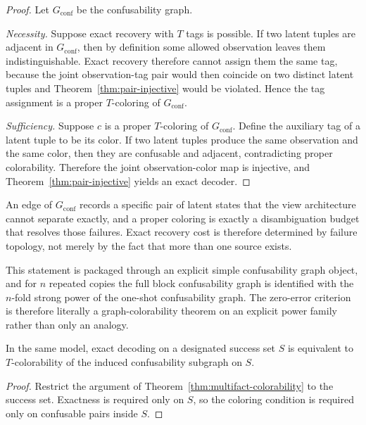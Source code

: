 \begin{proof}
Let $G_{\mathrm{conf}}$ be the confusability graph.

\emph{Necessity.} Suppose exact recovery with $T$ tags is possible. If two latent tuples are adjacent in $G_{\mathrm{conf}}$, then by definition some allowed observation leaves them indistinguishable. Exact recovery therefore cannot assign them the same tag, because the joint observation-tag pair would then coincide on two distinct latent tuples and Theorem~\ref{thm:pair-injective} would be violated. Hence the tag assignment is a proper $T$-coloring of $G_{\mathrm{conf}}$.

\emph{Sufficiency.} Suppose $c$ is a proper $T$-coloring of $G_{\mathrm{conf}}$. Define the auxiliary tag of a latent tuple to be its color. If two latent tuples produce the same observation and the same color, then they are confusable and adjacent, contradicting proper colorability. Therefore the joint observation-color map is injective, and Theorem~\ref{thm:pair-injective} yields an exact decoder.
\end{proof}

An edge of $G_{\mathrm{conf}}$ records a specific pair of latent states that the view architecture cannot separate exactly, and a proper coloring is exactly a disambiguation budget that resolves those failures. Exact recovery cost is therefore determined by failure topology, not merely by the fact that more than one source exists.

This statement is packaged through an explicit simple confusability graph object, and for $n$ repeated copies the full block confusability graph is identified with the $n$-fold strong power of the one-shot confusability graph. The zero-error criterion is therefore literally a graph-colorability theorem on an explicit power family rather than only an analogy.

\begin{theorem}\label{thm:multifact-success-set}
In the same model, exact decoding on a designated success set $S$ is equivalent to $T$-colorability of the induced confusability subgraph on $S$.
\end{theorem}

\begin{proof}
Restrict the argument of Theorem~\ref{thm:multifact-colorability} to the success set. Exactness is required only on $S$, so the coloring condition is required only on confusable pairs inside $S$.
\end{proof}

